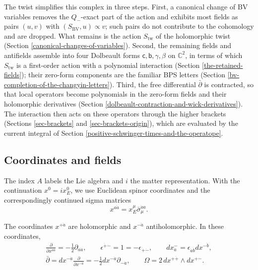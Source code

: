 \documentclass[11pt]{article}
\numberwithin{equation}{section}
\numberwithin{figure}{section}
\numberwithin{table}{section}
\begin{document}
The twist simplifies this complex in three steps. First, a canonical change of BV variables removes the $Q_-$-exact part of the action and exhibits most fields as pairs $(u,v)$ with $(S_{\mathrm{BV}},u)\propto v$; such pairs do not contribute to the cohomology and are dropped. What remains is the action $S_{\mathrm{tw}}$ of the holomorphic twist (Section \ref{canonical-changes-of-variables}). Second, the remaining fields and antifields assemble into four Dolbeault forms $\mathsf c,\mathsf b,\gamma,\beta$ on $\mathbb C^2$, in terms of which $S_{\mathrm{tw}}$ is a first-order action with a polynomial interaction (Section \ref{the-retained-fields}); their zero-form components are the familiar BPS letters (Section \ref{bv-completion-of-the-changyin-letters}). Third, the free differential $\bar\partial$ is contracted, so that local operators become polynomials in the zero-form fields and their holomorphic derivatives (Section \ref{dolbeault-contraction-and-wick-derivatives}). The interaction then acts on these operators through the higher brackets (Sections \ref{sec-brackets} and \ref{sec-brackets-origin}), which are evaluated by the current integral of Section \ref{positive-schwinger-times-and-the-operatope}.

\subsection{Coordinates and fields}\label{sec-A-conventions}

The index $A$ labels the Lie algebra and $i$ the matter representation. With the continuation $x^0=i x_E^0$, we use Euclidean spinor coordinates and the correspondingly continued sigma matrices
\begin{equation}\label{eq-Euclidean-coordinates}
x^{a\dot a}
=x_E^\mu\bar\sigma_\mu^{\dot a a}.
\end{equation}

The coordinates $x^{+\dot a}$ are holomorphic and $x^{-\dot a}$ antiholomorphic. In these coordinates,
\begin{equation}\label{eq-coordinates}
\begin{gathered}
\frac{\partial}{\partial x^{a\dot a}}=-\frac12\partial_{a\dot a},
\qquad \epsilon^{\dot+\dot-}=1=-\epsilon_{\dot+\dot-},
\qquad dx^-_{\dot a}=\epsilon_{\dot a\dot b}dx^{-\dot b},\\
\bar\partial=dx^{-\dot a}\frac{\partial}{\partial x^{-\dot a}}
=-\frac12dx^{-\dot a}\partial_{-\dot a},
\qquad\Omega=2\,dx^{+\dot+}\wedge dx^{+\dot-}.
\end{gathered}
\end{equation}
\end{document}
